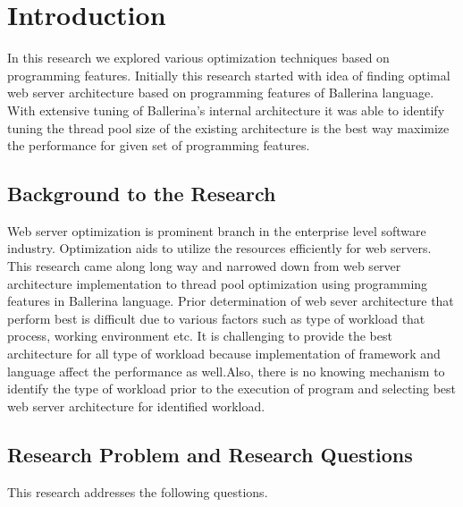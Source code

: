 \chapter{Introduction}

In this research we explored various optimization techniques based on programming features. Initially this research started with idea of finding optimal web server architecture based on programming features of Ballerina language. With extensive tuning of Ballerina's internal architecture it was able to identify tuning the thread pool size of the existing architecture is the best way maximize the performance for given set of programming features.

\section{Background to the Research}

Web server optimization is prominent branch in the enterprise level software industry. Optimization aids to utilize the resources efficiently for web servers. This research came along long way and narrowed down from web server architecture implementation to thread pool optimization using programming features in Ballerina language. Prior determination of web sever architecture that perform best is difficult due to various factors such as type of workload that process, working environment \cite{comp_ac} etc. It is challenging to provide the best architecture for all type of workload \cite{seda,events_are_bad,edprs} because implementation of framework and language affect the performance as well.Also, there is no knowing mechanism to identify the type of workload prior to the execution of program and selecting best web server architecture for identified workload. 

\newpage

\section{Research Problem and Research Questions}\label{sec:research_questions}

This research addresses the following questions.


